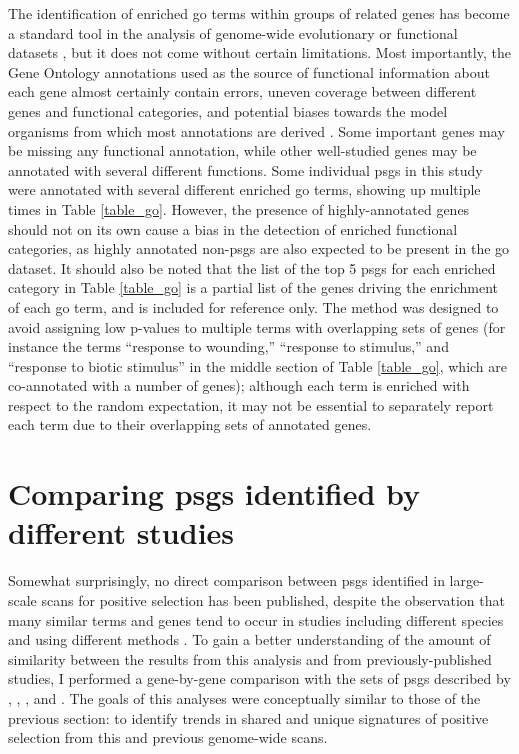 The identification of enriched \ac{go} terms within groups of related
genes has become a standard tool in the analysis of genome-wide
evolutionary or functional datasets \citep{Khatri2012}, but it does
not come without certain limitations. Most importantly, the Gene
Ontology annotations used as the source of functional information
about each gene almost certainly contain errors, uneven coverage
between different genes and functional categories, and potential
biases towards the model organisms from which most annotations are
derived \citep{Rhee2008}. Some important genes may be missing any
functional annotation, while other well-studied genes may be annotated
with several different functions. Some individual \acp{psg} in this
study were annotated with several different enriched \ac{go} terms,
showing up multiple times in Table \ref{table_go}. However, the
presence of highly-annotated genes should not on its own cause a bias
in the detection of enriched functional categories, as highly
annotated non-\acp{psg} are also expected to be present in the
\ac{go} dataset. It should also be noted that the list of the top 5
\acp{psg} for each enriched category in Table \ref{table_go} is a
partial list of the genes driving the enrichment of each \ac{go} term,
and is included for reference only. The \topgo method was designed to
avoid assigning low p-values to multiple terms with overlapping sets
of genes (for instance the terms ``response to wounding,'' ``response
to stimulus,'' and ``response to biotic stimulus'' in the middle
section of Table \ref{table_go}, which are co-annotated with a number
of genes); although each term is enriched with respect to the random
expectation, it may not be essential to separately report each term
due to their overlapping sets of annotated genes.


\section{Comparing \acp{psg} identified by different studies}

Somewhat surprisingly, no direct comparison between \acp{psg}
identified in large-scale scans for positive selection has been
published, despite the observation that many similar terms and genes
tend to occur in studies including different species and using
different methods \citep{Nielsen2005,Kosiol2008}. To gain a better
understanding of the amount of similarity between the results from
this analysis and from previously-published studies, I performed a
gene-by-gene comparison with the sets of \acp{psg} described by
\citet{Clark2003}, \citet{Nielsen2005}, \citet{Macaque2007}, and
\citet{Kosiol2008}. The goals of this analyses were conceptually
similar to those of the previous section: to identify trends in shared
and unique signatures of positive selection from this and previous
genome-wide scans.

